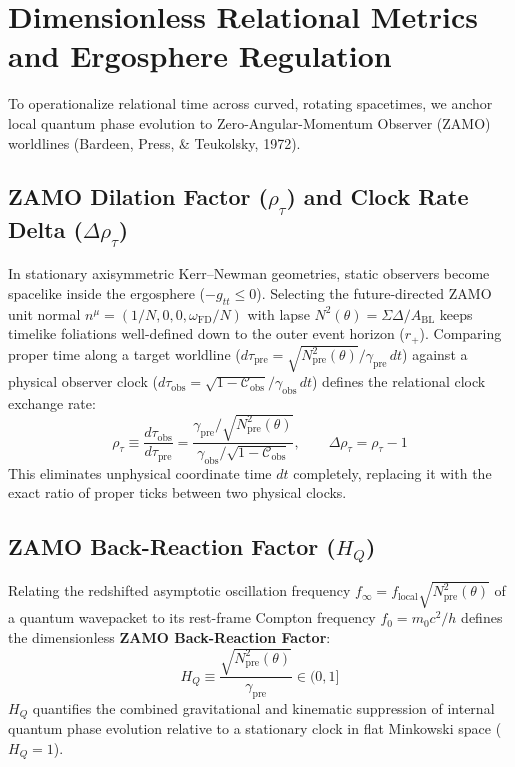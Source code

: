\documentclass[11pt,a4paper]{article}
\begin{document}
\section{Dimensionless Relational Metrics and Ergosphere Regulation}

To operationalize relational time across curved, rotating spacetimes, we anchor local quantum phase evolution to Zero-Angular-Momentum Observer (ZAMO) worldlines (Bardeen, Press, \& Teukolsky, 1972).

\subsection{ZAMO Dilation Factor ($\rho_\tau$) and Clock Rate Delta ($\Delta\rho_\tau$)}

In stationary axisymmetric Kerr--Newman geometries, static observers become spacelike inside the ergosphere ($-g_{tt} \le 0$). Selecting the future-directed ZAMO unit normal $n^\mu = (1/N, 0, 0, \omega_{\text{FD}}/N)$ with lapse $N^2(\theta) = \Sigma\Delta / A_{\text{BL}}$ keeps timelike foliations well-defined down to the outer event horizon ($r_+$). Comparing proper time along a target worldline ($d\tau_{\text{pre}} = \sqrt{N^2_{\text{pre}}(\theta)}/\gamma_{\text{pre}}\,dt$) against a physical observer clock ($d\tau_{\text{obs}} = \sqrt{1 - \mathcal{C}_{\text{obs}}}/\gamma_{\text{obs}}\,dt$) defines the relational clock exchange rate:
\begin{equation}
\rho_\tau \equiv \frac{d\tau_{\text{obs}}}{d\tau_{\text{pre}}} = \frac{\gamma_{\text{pre}} / \sqrt{N^2_{\text{pre}}(\theta)}}{\gamma_{\text{obs}} / \sqrt{1 - \mathcal{C}_{\text{obs}}}}, \qquad \Delta\rho_\tau = \rho_\tau - 1
\end{equation}
This eliminates unphysical coordinate time $dt$ completely, replacing it with the exact ratio of proper ticks between two physical clocks.

\subsection{ZAMO Back-Reaction Factor ($H_Q$)}

Relating the redshifted asymptotic oscillation frequency $f_\infty = f_{\text{local}}\sqrt{N^2_{\text{pre}}(\theta)}$ of a quantum wavepacket to its rest-frame Compton frequency $f_0 = m_0 c^2 / h$ defines the dimensionless \textbf{ZAMO Back-Reaction Factor}:
\begin{equation}
H_Q \equiv \frac{\sqrt{N^2_{\text{pre}}(\theta)}}{\gamma_{\text{pre}}} \in (0, 1]
\end{equation}
$H_Q$ quantifies the combined gravitational and kinematic suppression of internal quantum phase evolution relative to a stationary clock in flat Minkowski space ($H_Q = 1$).
\end{document}

